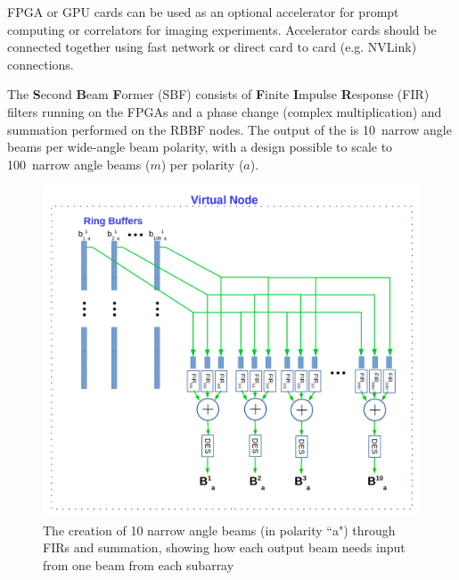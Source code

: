 \documentclass[12pt,a4paper]{article}
\begin{document}
FPGA or GPU cards can be used as an optional accelerator for prompt computing or correlators for imaging experiments. 
Accelerator cards should be connected together using fast network or direct card to card (e.g. NVLink) connections.

\iffalse
The {\bf S}econd {\bf B}eam {\bf F}ormer (SBF) consists of 
{\bf F}inite {\bf I}mpulse {\bf R}esponse (FIR) filters running on the \fsru FPGAs and a phase change (complex multiplication) and summation performed on the RBBF nodes.
The output of the \sbf is 10~narrow angle beams per wide-angle beam polarity, with a design possible to scale to 100~narrow angle beams ($m$) per polarity ($a$). 
\begin{figure}[!h]
\centering
\includegraphics[width=\textwidth]{E3D_dataflow_2aa.png}
\caption{The creation of 10 narrow angle beams (in polarity ``a") through FIRs and summation, showing how each output beam needs input from one beam from each subarray~\label{fig:beams}}
\end{figure}
\end{document}
